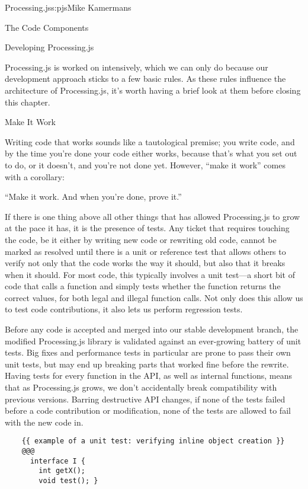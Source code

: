 \begin{aosachapter}{Processing.js}{s:pjs}{Mike Kamermans}
\begin{aosasect1}{The Code Components}
\end{aosasect1}

\begin{aosasect1}{Developing Processing.js}

Processing.js is worked on intensively, which we can only do because
our development approach sticks to a few basic rules. As these rules
influence the architecture of Processing.js, it's worth having a brief
look at them before closing this chapter.

\begin{aosasect2}{Make It Work}

Writing code that works sounds like a tautological premise; you write
code, and by the time you're done your code either works, because
that's what you set out to do, or it doesn't, and you're not done
yet. However, ``make it work'' comes with a corollary:

``Make it work. And when you're done, prove it.''

If there is one thing above all other things that has allowed
Processing.js to grow at the pace it has, it is the presence of
tests. Any ticket that requires touching the code, be it either by
writing new code or rewriting old code, cannot be marked as resolved
until there is a unit or reference test that allows others to verify
not only that the code works the way it should, but also that it
breaks when it should. For most code, this typically involves a unit
test---a short bit of code that calls a function and simply tests
whether the function returns the correct values, for both legal and
illegal function calls. Not only does this allow us to test code
contributions, it also lets us perform regression tests.

Before any code is accepted and merged into our stable development
branch, the modified Processing.js library is validated against an
ever-growing battery of unit tests. Big fixes and performance tests in
particular are prone to pass their own unit tests, but may end up
breaking parts that worked fine before the rewrite. Having tests for
every function in the API, as well as internal functions, means that
as Processing.js grows, we don't accidentally break compatibility with
previous versions. Barring destructive API changes, if none of the
tests failed before a code contribution or modification, none of the
tests are allowed to fail with the new code in.

\begin{verbatim}
    {{ example of a unit test: verifying inline object creation }}
    @@@
      interface I {
        int getX();
        void test(); }


\end{verbatim}
\end{aosasect2}
\end{aosasect1}
\end{aosachapter}
